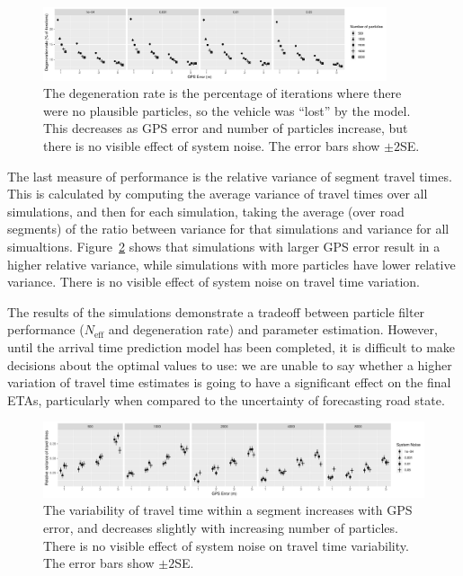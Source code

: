 \begin{figure}[tb]
    \centering
    \includegraphics[width=0.9\textwidth]{figures/04_model_results_degen.pdf}
    \caption{
        The degeneration rate is the percentage of iterations where there were no
        plausible particles, so the vehicle was ``lost'' by the model.
        This decreases as GPS error and number of particles increase,
        but there is no visible effect of system noise.
        The error bars show $\pm 2$SE.
    }
    \label{fig:degen_rate}
\end{figure}


The last measure of performance is the relative variance of segment travel times.
This is calculated by computing the average variance of travel times over all simulations,
and then for each simulation, 
taking the average (over road segments) of the ratio between variance for that simulations
and variance for all simualtions.
Figure~\ref{fig:travel_times} shows that simulations with larger GPS error
result in a higher relative variance,
while simulations with more particles have lower relative variance.
There is no visible effect of system noise on travel time variation.


The results of the simulations
demonstrate a tradeoff between particle filter performance
($N_\text{eff}$ and degeneration rate) and parameter estimation.
However, until the arrival time prediction model has been completed,
it is difficult to make decisions about the optimal values to use:
we are unable to say whether a higher variation of travel time estimates
is going to have a significant effect on the final ETAs,
particularly when compared to the uncertainty of forecasting road state.


\begin{figure}[tb]
    \centering
    \includegraphics[width=\textwidth]{figures/04_model_results_times.pdf}
    \caption{
        The variability of travel time within a segment increases with GPS error,
        and decreases slightly with increasing number of particles.
        There is no visible effect of system noise on travel time variability.
        The error bars show $\pm 2$SE.
    }
    \label{fig:travel_times}
\end{figure}


